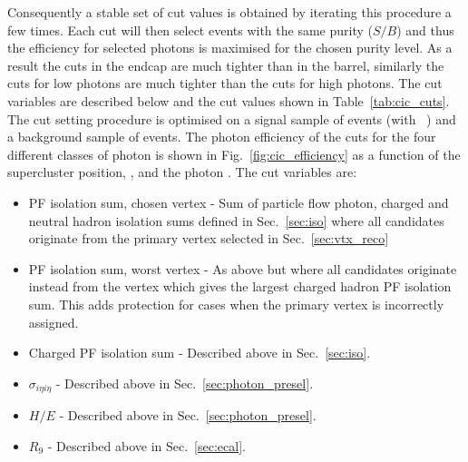 Consequently a stable set of cut values is obtained by iterating this procedure a few times. Each cut will then select events with the same purity ($S/B$) and thus the efficiency for selected photons is maximised for the chosen purity level. As a result the cuts in the endcap are much tighter than in the barrel, similarly the cuts for low \rnine photons are much tighter than the cuts for high \rnine photons. The cut variables are described below and the cut values shown in Table~\ref{tab:cic_cuts}. The cut setting procedure is optimised on a signal sample of \Hgg \MC events (with ~\GeV) and a background sample of \gjet events. The photon efficiency of the cuts for the four different classes of photon is shown in Fig.~\ref{fig:cic_efficiency} as a function of the supercluster position, \eta, and the photon \pT. The cut variables are:

\begin{itemize}
  \item PF isolation sum, chosen vertex - Sum of particle flow photon, charged and neutral hadron isolation sums defined in Sec.~\ref{sec:iso} where all \PF candidates originate from the primary vertex selected in Sec.~\ref{sec:vtx_reco}
  \item PF isolation sum, worst vertex - As above but where all \PF candidates originate instead from the vertex which gives the largest charged hadron PF isolation sum. This adds protection for cases when the primary vertex is incorrectly assigned.
  \item Charged PF isolation sum - Described above in Sec.~\ref{sec:iso}.
  \item $\sigma_{i\eta i\eta}$ - Described above in Sec.~\ref{sec:photon_presel}.
  \item $H/E$ - Described above in Sec.~\ref{sec:photon_presel}.
  \item $R_{9}$ - Described above in Sec.~\ref{sec:ecal}.
\end{itemize}

